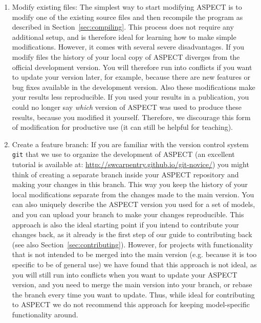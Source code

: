 \documentclass{article}
\newcommand{\aspect}{\textsc{ASPECT}}
\begin{document}
\begin{enumerate}
\item Modify existing files: The simplest way to start modifying \aspect{} is
to modify one of the existing source files and then recompile the program as
described in Section~\ref{sec:compiling}. This process does not require any
additional setup, and is therefore ideal for learning how to make simple
modifications. However, it comes with several severe disadvantages. If you
modify files the history of your local copy of \aspect{} diverges from the
official development version. You will therefore run into conflicts if you want
to update your version later, for example, because there are new features or
bug fixes available in the development version. Also these modifications make
your results less reproducible. If you used your results in a publication, you
could no longer say \textit{which} version of \aspect{} was used to produce
these results, because you modified it yourself. Therefore, we discourage this
form of modification for productive use (it can still be helpful for teaching).

\item Create a feature branch: If you are familiar with the version control
system \texttt{git} that we use to organize the development of \aspect{} (an
excellent tutorial is available at:
\url{http://swcarpentry.github.io/git-novice/}) you might think of creating a
separate branch inside your \aspect{} repository and making your changes in
this branch. This way you keep the history of your local modifications separate
from the changes made to the main version. You can also uniquely describe the
\aspect{} version you used for a set of models, and you can upload your branch
to make your changes reproducible. This approach is also the ideal starting
point if you intend to contribute your changes back, as it already is the first
step of our guide to contributing back (see also
Section~\ref{sec:contributing}).  However, for projects with functionality that
is not intended to be merged into the main version (e.g. because it is too
specific to be of general use) we have found that this approach is not ideal,
as you will still run into conflicts when you want to update your \aspect{}
version, and you need to merge the main version into your branch, or rebase the
branch every time you want to update. Thus, while ideal for contributing to
\aspect{} we do not recommend this approach for keeping model-specific
functionality around.


\end{enumerate}
\end{document}
